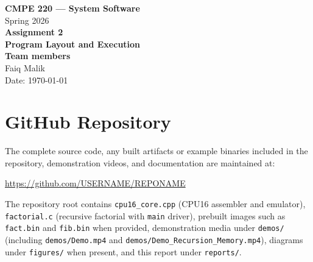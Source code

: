 \documentclass[12pt]{article}
\newcommand{\githuburl}{https://github.com/USERNAME/REPONAME}
\begin{document}
\begin{titlepage}
    \thispagestyle{empty}
    \centering
    \vspace*{1.5in}

    {\LARGE\bfseries CMPE 220 --- System Software}\\[0.35in]
    {\Large Spring 2026}\\[0.75in]

    {\LARGE\bfseries Assignment 2}\\[0.2in]
    {\LARGE\bfseries Program Layout and Execution}\\[1.25in]

    {\large\bfseries Team members}\\[0.2in]
    {\large Faiq Malik}\\[1.5in]

    {\large Date: \today}
\end{titlepage}

\clearpage
\setcounter{page}{1}

\section*{GitHub Repository}

\noindent
The complete source code, any built artifacts or example binaries included in the repository, demonstration videos, and documentation are maintained at:

\vspace{0.5in}
\begin{center}
\large\url{\githuburl}
\end{center}

\vspace{0.35in}
\noindent
The repository root contains \texttt{cpu16\_core.cpp} (CPU16 assembler and emulator), \texttt{factorial.c} (recursive factorial with \texttt{main} driver), prebuilt images such as \texttt{fact.bin} and \texttt{fib.bin} when provided, demonstration media under \texttt{demos/} (including \texttt{demos/Demo.mp4} and \texttt{demos/Demo\_Recursion\_Memory.mp4}), diagrams under \texttt{figures/} when present, and this report under \texttt{reports/}.

\clearpage
\end{document}
